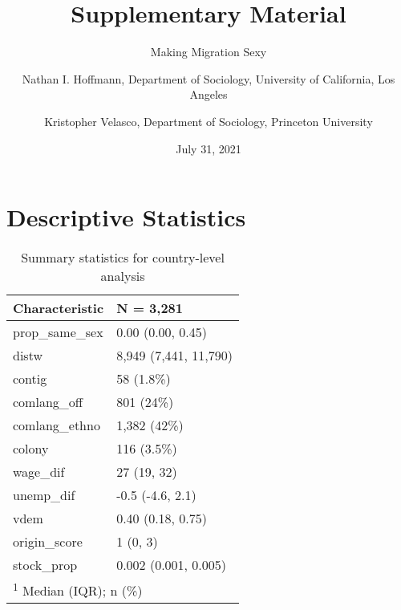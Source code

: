 \documentclass[
  11pt,
]{article}
\title{Supplementary Material}
\subtitle{Making Migration Sexy}
\author{Nathan I. Hoffmann, Department of Sociology, University of California, Los Angeles \and Kristopher Velasco, Department of Sociology, Princeton University}
\date{July 31, 2021}
\begin{document}
\maketitle

{
\hypersetup{linkcolor=}
\setcounter{tocdepth}{2}
\tableofcontents
}
\hypertarget{descriptive-statistics}{%
\section{Descriptive Statistics}\label{descriptive-statistics}}

\begin{table}

\caption{\label{tab:desc-table-country}Summary statistics for country-level analysis}
\centering
\fontsize{8}{10}\selectfont
\begin{tabular}[t]{ll}
\toprule
Characteristic & N = 3,281\\
\midrule
prop\_same\_sex & 0.00 (0.00, 0.45)\\
distw & 8,949 (7,441, 11,790)\\
contig & 58 (1.8\%)\\
comlang\_off & 801 (24\%)\\
comlang\_ethno & 1,382 (42\%)\\
\addlinespace
colony & 116 (3.5\%)\\
wage\_dif & 27 (19, 32)\\
unemp\_dif & -0.5 (-4.6, 2.1)\\
vdem & 0.40 (0.18, 0.75)\\
origin\_score & 1 (0, 3)\\
\addlinespace
stock\_prop & 0.002 (0.001, 0.005)\\
\bottomrule
\multicolumn{2}{l}{\rule{0pt}{1em}\textsuperscript{1} Median (IQR); n (\%)}\\
\end{tabular}
\end{table}
\end{document}
